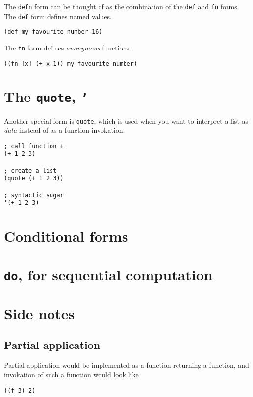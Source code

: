 \documentclass[11pt]{article}
\begin{document}
The \texttt{defn} form can be thought of
as the combination of the \texttt{def} and \texttt{fn} forms.
The \texttt{def} form defines named values.
\begin{verbatim}
(def my-favourite-number 16)
\end{verbatim}

The \texttt{fn} form defines \emph{anonymous} functions.
\begin{verbatim}
((fn [x] (+ x 1)) my-favourite-number)
\end{verbatim}

\section{The \texttt{quote}, \texttt{'}}
\label{sec:orgee23a52}
Another special form is \texttt{quote}, which is used
when you want to interpret a list as \emph{data} instead
of as a function invokation.
\begin{verbatim}
; call function +
(+ 1 2 3)

; create a list
(quote (+ 1 2 3))

; syntactic sugar
'(+ 1 2 3)
\end{verbatim}

\section{Conditional forms}
\label{sec:org6809333}

\section{\texttt{do}, for sequential computation}
\label{sec:orgd290249}


\section{Side notes}
\label{sec:orgebcde90}
\subsection{Partial application}
\label{sec:org50981b3}
Partial application would be implemented as
a function returning a function,
and invokation of such a function would look like
\begin{verbatim}
((f 3) 2)
\end{verbatim}
\end{document}
